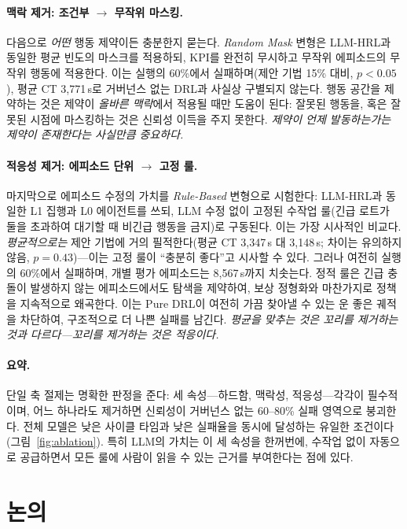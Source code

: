 \documentclass[letterpaper]{article} %
\begin{document}
\paragraph{맥락 제거: 조건부 $\to$ 무작위 마스킹.}
다음으로 \emph{어떤} 행동 제약이든 충분한지 묻는다. \emph{Random Mask} 변형은
LLM-HRL과 동일한 평균 빈도의 마스크를 적용하되, KPI를 완전히 무시하고 무작위
에피소드의 무작위 행동에 적용한다. 이는 실행의 60\%에서 실패하며(제안 기법 15\% 대비,
$p<0.05$), 평균 CT 3{,}771\,s로 거버넌스 없는 DRL과 사실상 구별되지 않는다. 행동
공간을 제약하는 것은 제약이 \emph{올바른 맥락}에서 적용될 때만 도움이 된다: 잘못된
행동을, 혹은 잘못된 시점에 마스킹하는 것은 신뢰성 이득을 주지 못한다. \emph{제약이
언제 발동하는가는 제약이 존재한다는 사실만큼 중요하다.}

\paragraph{적응성 제거: 에피소드 단위 $\to$ 고정 룰.}
마지막으로 에피소드 수정의 가치를 \emph{Rule-Based} 변형으로 시험한다: LLM-HRL과
동일한 L1 집행과 L0 에이전트를 쓰되, LLM 수정 없이 고정된 수작업 룰(긴급 로트가 둘을
초과하여 대기할 때 비긴급 행동을 금지)로 구동된다. 이는 가장 시사적인 비교다.
\emph{평균적으로는} 제안 기법에 거의 필적한다(평균 CT 3{,}347\,s 대 3{,}148\,s; 차이는
유의하지 않음, $p=0.43$)---이는 고정 룰이 ``충분히 좋다''고 시사할 수 있다. 그러나
여전히 실행의 60\%에서 실패하며, 개별 평가 에피소드는 8{,}567\,s까지 치솟는다. 정적
룰은 긴급 충돌이 발생하지 않는 에피소드에서도 탐색을 제약하여, 보상 정형화와 마찬가지로
정책을 지속적으로 왜곡한다. 이는 Pure DRL이 여전히 가끔 찾아낼 수 있는 운 좋은 궤적을
차단하여, 구조적으로 더 나쁜 실패를 남긴다. \emph{평균을 맞추는 것은 꼬리를 제거하는
것과 다르다---꼬리를 제거하는 것은 적응이다.}

\paragraph{요약.}
단일 축 절제는 명확한 판정을 준다: 세 속성---하드함, 맥락성, 적응성---각각이
필수적이며, 어느 하나라도 제거하면 신뢰성이 거버넌스 없는 60--80\% 실패 영역으로
붕괴한다. 전체 모델은 낮은 사이클 타임과 낮은 실패율을 동시에 달성하는 유일한
조건이다(그림~\ref{fig:ablation}). 특히 LLM의 가치는 이 세 속성을 한꺼번에, 수작업
없이 자동으로 공급하면서 모든 룰에 사람이 읽을 수 있는 근거를 부여한다는 점에 있다.

\section{논의}
\label{sec:discussion}
\end{document}
